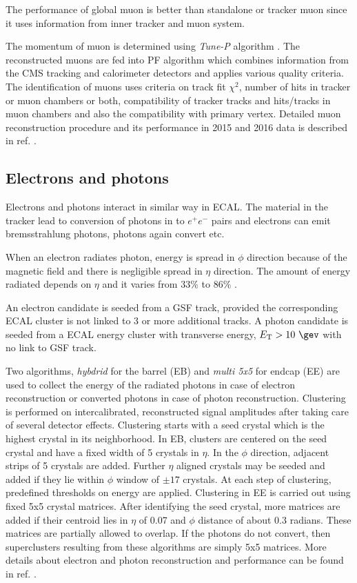 The performance of global muon is better than standalone or tracker muon since it uses information from inner tracker and muon system.

The momentum of muon is determined using \textit{Tune-P} algorithm \cite{Chatrchyan:2012xi}. The reconstructed muons are fed into PF 
algorithm which combines information from the CMS tracking and calorimeter detectors and applies various quality criteria. The identification of muons uses 
criteria on track fit $\chi^2$, number of hits in tracker or muon chambers or both, compatibility of tracker tracks and hits/tracks in 
muon chambers and also the  compatibility with primary vertex. Detailed muon reconstruction procedure and its performance in 2015 and 2016 
data is described in ref. \cite{Sirunyan:2018fpa}.

\subsection{Electrons and photons}
Electrons and photons interact in similar way in ECAL. The material in the tracker lead to conversion of photons in to $e^+e^-$ pairs and 
electrons can emit bremsstrahlung photons, photons again convert etc.

When an electron radiates photon, energy is spread in $\phi$ direction because of the magnetic field and there is negligible spread in 
$\eta$ direction. The amount of energy radiated depends on $\eta$ and it varies from 33\% to 86\% \cite{Khachatryan:2015hwa}.

An electron candidate is seeded from a GSF track, provided the corresponding ECAL cluster is not linked to 3 or more additional tracks. A 
photon candidate is seeded from a ECAL energy cluster with transverse energy, $\et > 10\ \gev$ with no link to GSF track.

Two algorithms, \textit{hybdrid} for the barrel (EB) and \textit{multi 5x5} for endcap (EE) \cite{Khachatryan:2015hwa} are used to collect 
the energy of the radiated photons in case of electron reconstruction or converted photons in case of photon reconstruction. Clustering is 
performed  on intercalibrated, reconstructed signal amplitudes after taking care of several detector effects. Clustering starts with a 
seed crystal which is the highest \et crystal in its neighborhood. In EB, clusters are centered on the seed crystal and have a fixed width 
of 5 crystals in $\eta$. In the $\phi$ direction, adjacent strips of 5 crystals are added. Further $\eta$ aligned crystals may be seeded 
and added if they lie within $\phi$ window of $\pm17$ crystals. At each step of clustering, predefined thresholds on energy are applied. 
Clustering in EE is carried out using fixed 5x5 crystal matrices. After identifying the seed crystal, more matrices are added if their 
centroid lies in  $\eta$ of 0.07 and $\phi$ distance of about 0.3 radians. These matrices are partially allowed to overlap. If the photons 
do not convert, then superclusters resulting from these algorithms are simply 5x5 matrices. More details about electron and photon 
reconstruction and performance can be found in ref. \cite{Khachatryan:2015hwa,CMS:EGM-14-001}.

